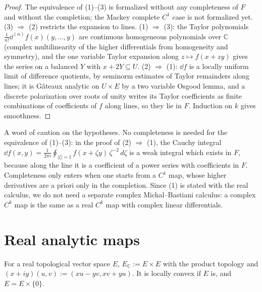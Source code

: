 \begin{proof}
  \leanok
  The equivalence of (1)--(3) is formalized without any completeness of $F$ and without the
  completion; the Mackey complete $C^1$ case is not formalized yet. (3) $\Rightarrow$ (2) restricts
  the expansion to lines. (1) $\Rightarrow$ (3): the Taylor polynomials
  $\frac{1}{n!}\dd^{(n)} f(x)(y, \dots, y)$ are continuous homogeneous polynomials over
  $\mathbb{C}$ (complex multilinearity of the higher differentials from homogeneity and symmetry),
  and the one variable Taylor expansion along $z \mapsto f(x + zy)$ gives the series on a balanced
  $Y$ with $x + 2Y \subseteq U$. (2) $\Rightarrow$ (1): $\dd f$ is a locally uniform limit of
  difference quotients, by seminorm estimates of Taylor remainders along lines; it is Gâteaux
  analytic on $U \times E$ by a two variable Osgood lemma, and a discrete polarization over roots of
  unity writes its Taylor coefficients as finite combinations of coefficients of $f$ along lines,
  so they lie in $F$. Induction on $k$ gives smoothness.
\end{proof}

\begin{remark}
  A word of caution on the hypotheses. No completeness is needed for the equivalence of (1)--(3):
  in the proof of (2) $\Rightarrow$ (1), the Cauchy integral
  $\dd f(x, y) = \frac{1}{2\pi i} \oint_{|\zeta| = 1} f(x + \zeta y)\, \zeta^{-2}\, d\zeta$ is a
  weak integral which exists in $F$, because along the line it is a coefficient of a power series
  with coefficients in $F$. Completeness only enters when one starts from a $C^1$ map, whose
  higher derivatives are a priori only in the completion. Since (1) is stated with the real
  calculus, we do not need a separate complex Michal--Bastiani calculus: a complex $C^k$ map is
  the same as a real $C^k$ map with complex linear differentials.
\end{remark}

\section{Real analytic maps}

\begin{definition}
  \label{def:complexification}
  \leanok
  For a real topological vector space $E$, $E_{\mathbb{C}} := E \times E$ with the product
  topology and $(x + iy)(u, v) := (xu - yv, xv + yu)$. It is locally convex if $E$ is, and
  $E = E \times \{0\}$.
\end{definition}

